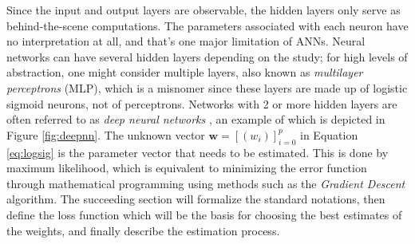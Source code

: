 Since the input and output layers are observable, the hidden layers only serve as behind-the-scene computations. The parameters associated with each neuron have no interpretation at all, and that's one major limitation of ANNs. Neural networks can have several hidden layers depending on the study; for high levels of abstraction, one might consider multiple layers, also known as \textit{multilayer perceptrons} (MLP), which is a misnomer since these layers are made up of logistic sigmoid neurons, not of perceptrons. Networks with 2 or more hidden layers are often referred to as \textit{deep neural networks} \cite{nndeepl}, an example of which is depicted in Figure \ref{fig:deepnn}. The unknown vector $\mathbf{w}=[(w_i)]_{i=0}^p$ in Equation \ref{eq:logsig} is the parameter vector that needs to be estimated. This is done by maximum likelihood, which is equivalent to minimizing the error function through mathematical programming using methods such as the \textit{Gradient Descent} algorithm. The succeeding section will formalize the standard notations, then define the loss function which will be the basis for choosing the best estimates of the weights, and finally describe the estimation process.

